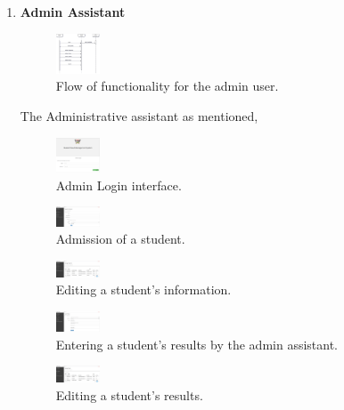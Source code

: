\begin{enumerate}
\item \textbf{Admin Assistant}
\begin{figure}[H]
\caption{Flow of functionality for the admin user.}
\includegraphics[width=1.3cm]{images/SequenceAdmin.png}
\end{figure}
The Administrative assistant as mentioned, 
\begin{figure}[H]
\caption{Admin Login interface.}
\includegraphics[width=1.3cm]{images/admin_login.png}
\end{figure}
\begin{figure}[H]
\caption{Admission of a student.}
\includegraphics[width=1.3cm]{images/add_student.png}
\end{figure}
\begin{figure}[H]
\caption{Editing a student's information.}
\includegraphics[width=1.3cm]{images/manage_students.png}
\end{figure}

\begin{figure}[H]
\caption{Entering a student's results by the admin assistant.}
\includegraphics[width=1.3cm]{images/enter_results.png}
\end{figure}

\begin{figure}[H]
\caption{Editing a student's results.}
\includegraphics[width=1.3cm]{images/manage_results.png}
\end{figure}


\end{enumerate}
